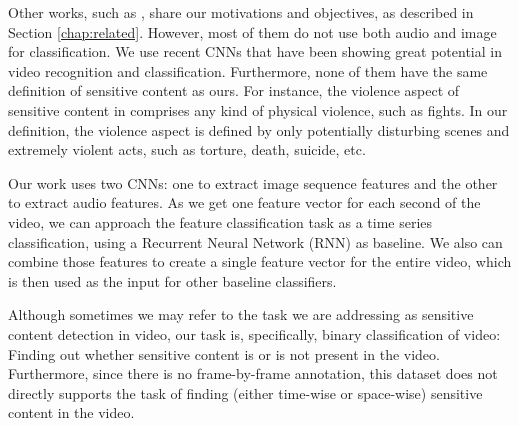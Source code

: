 Other works, such as \cite{moreira2019multimodal}, share our motivations and objectives, as described in Section \ref{chap:related}. However, most of them do not use both audio and image for classification. We use recent CNNs that have been showing great potential in video recognition and classification. Furthermore, none of them have the same definition of sensitive content as ours. For instance, the violence aspect of sensitive content in \cite{moreira2019multimodal} comprises any kind of physical violence, such as fights. In our definition, the violence aspect is defined by only potentially disturbing scenes and extremely violent acts, such as torture, death, suicide, etc. %

Our work uses two CNNs: one to extract image sequence features and the other to extract audio features.
As we get one feature vector for each second of the video, we can approach the feature classification task as a time series classification, using a Recurrent Neural Network (RNN) as baseline. We also can combine those features to create a single feature vector for the entire video, which is then used as the input for other baseline classifiers.




Although sometimes we may refer to the task we are addressing as sensitive content detection in video, our task is, specifically, binary classification of video: Finding out whether sensitive content is or is not present in the video. 
Furthermore, since there is no frame-by-frame annotation, this dataset does not directly supports the task of finding (either time-wise or space-wise) sensitive content in the video. 







